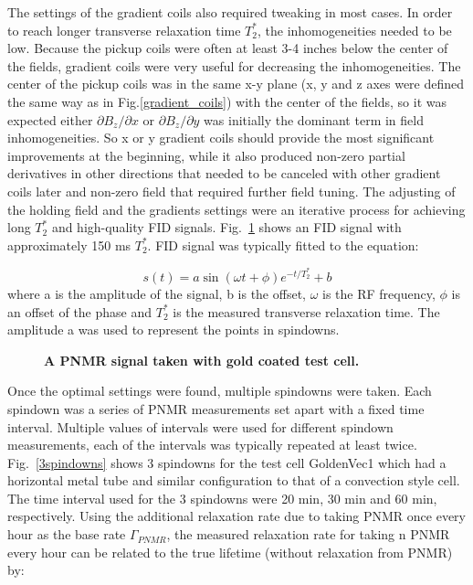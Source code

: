 The settings of the gradient coils also required tweaking in most cases. In order to reach longer transverse relaxation time $T_2^*$, the inhomogeneities needed to be low. Because the pickup coils were often at least 3-4 inches below the center of the fields, gradient coils were very useful for decreasing the inhomogeneities. The center of the pickup coils was in the same x-y plane (x, y and z axes were defined the same way as in Fig.\ref{gradient_coils}) with the center of the fields, so it was expected either $\partial B_z/\partial x$ or $\partial B_z/\partial y$ was initially the dominant term in field inhomogeneities. So x or y gradient coils should provide the most significant improvements at the beginning, while it also produced non-zero partial derivatives in other directions that needed to be canceled with other gradient coils later and non-zero field that required further field tuning. The adjusting of the holding field and the gradients settings were an iterative process for achieving long $T_2^*$ and high-quality FID signals. Fig.~\ref{FID} shows an FID signal with approximately 150 ms $T_2^*$. FID signal was typically fitted to the equation:

\begin{equation}
s(t)=a\sin(\omega t+\phi)e^{-t/T_{2}^{*}}+b
\end{equation}
where a is the amplitude of the signal, b is the offset, $\omega$ is the RF frequency, $\phi$ is an offset of the phase and $T_{2}^{*}$ is the measured transverse relaxation time. The amplitude a was used to represent the points in spindowns.

\begin{figure}[H]
	\centering
	\caption{{\bf A PNMR signal taken with gold coated test cell.}}
	\label{FID}
\end{figure}

Once the optimal settings were found, multiple spindowns were taken. Each spindown was a series of PNMR measurements set apart with a fixed time interval. Multiple values of intervals were used for different spindown measurements, each of the intervals was typically repeated at least twice. Fig.~\ref{3spindowns} shows 3 spindowns for the test cell GoldenVec1 which had a horizontal metal tube and similar configuration to that of a convection style cell. The time interval used for the 3 spindowns were 20 min, 30 min and 60 min, respectively. Using the additional relaxation rate due to taking PNMR once every hour as the base rate $\Gamma_{PNMR}$, the measured relaxation rate for taking n PNMR every hour can be related to the true lifetime (without relaxation from PNMR) by:

